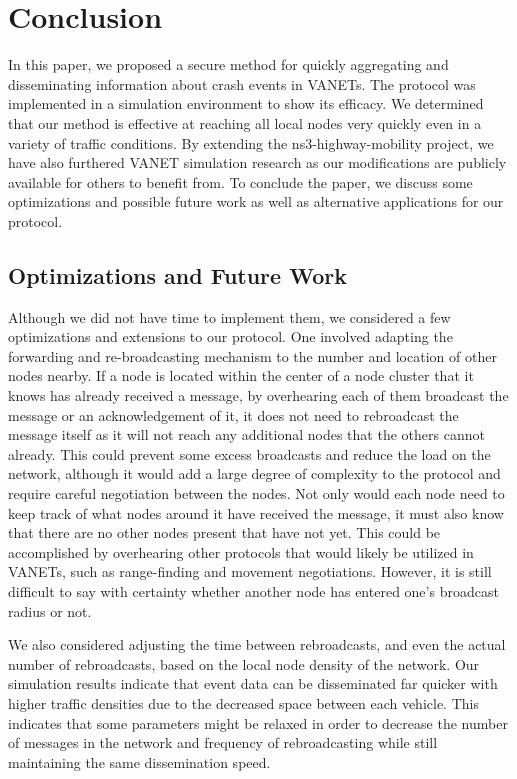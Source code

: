 \documentclass{IEEEtran}
\begin{document}
\section{Conclusion}

In this paper, we proposed a secure method for quickly aggregating and disseminating information about crash events in VANETs.
The protocol was implemented in a simulation environment to show its efficacy.
We determined that our method is effective at reaching all local nodes very quickly even in a variety of traffic conditions.
By extending the ns3-highway-mobility project, we have also furthered VANET simulation research as our modifications are publicly available for others to benefit from.
To conclude the paper, we discuss some optimizations and possible future work as well as alternative applications for our protocol.

\subsection{Optimizations and Future Work}

Although we did not have time to implement them, we considered a few optimizations and extensions to our protocol.
One involved adapting the forwarding and re-broadcasting mechanism to the number and location of other nodes nearby.
If a node is located within the center of a node cluster that it knows has already received a message, by overhearing each of them broadcast the message or an acknowledgement of it, it does not need to rebroadcast the message itself as it will not reach any additional nodes that the others cannot already.
This could prevent some excess broadcasts and reduce the load on the network, although it would add a large degree of complexity to the protocol and require careful negotiation between the nodes.
Not only would each node need to keep track of what nodes around it have received the message, it must also know that there are no other nodes present that have not yet.
This could be accomplished by overhearing other protocols that would likely be utilized in VANETs, such as range-finding and movement negotiations.
However, it is still difficult to say with certainty whether another node has entered one's broadcast radius or not.

We also considered adjusting the time between rebroadcasts, and even the actual number of rebroadcasts, based on the local node density of the network.
Our simulation results indicate that event data can be disseminated far quicker with higher traffic densities due to the decreased space between each vehicle.
This indicates that some parameters might be relaxed in order to decrease the number of messages in the network and frequency of rebroadcasting while still maintaining the same dissemination speed.
\end{document}
